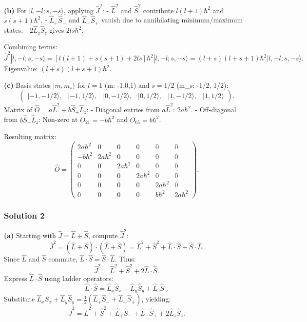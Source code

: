 \documentclass{article}
\begin{document}
\textbf{(b)} For \(|l, -l; s, -s\rangle\), applying \(\hat{J}^2\):
- \(\hat{L}^2\) and \(\hat{S}^2\) contribute \(l(l+1)\hbar^2\) and \(s(s+1)\hbar^2\).
- \(\hat{L}_+ \hat{S}_-\) and \(\hat{L}_- \hat{S}_+\) vanish due to annihilating minimum/maximum states.
- \(2\hat{L}_z \hat{S}_z\) gives \(2ls\hbar^2\).

Combining terms:
\[
\hat{J}^2 |l, -l; s, -s\rangle = \left[ l(l+1) + s(s+1) + 2ls \right]\hbar^2 |l, -l; s, -s\rangle = (l+s)(l+s+1)\hbar^2 |l, -l; s, -s\rangle.
\]
Eigenvalue: \((l+s)(l+s+1)\hbar^2\).

\textbf{(c)} Basis states \(|m, m_s\rangle\) for \(l=1\) (m: -1,0,1) and \(s=1/2\) (m_s: -1/2, 1/2):
\[
\begin{pmatrix}
| -1, -1/2 \rangle, & | -1, 1/2 \rangle, & | 0, -1/2 \rangle, & | 0, 1/2 \rangle, & | 1, -1/2 \rangle, & | 1, 1/2 \rangle
\end{pmatrix}.
\]
Matrix of \(\hat{O} = a\hat{L}^2 + b\hat{S}_+\hat{L}_z\):
- Diagonal entries from \(a\hat{L}^2\): \(2a\hbar^2\).
- Off-diagonal from \(b\hat{S}_+\hat{L}_z\): Non-zero at \(O_{21} = -b\hbar^2\) and \(O_{65} = b\hbar^2\).

Resulting matrix:
\[
\hat{O} = \begin{pmatrix}
2a\hbar^2 & 0 & 0 & 0 & 0 & 0 \\
-b\hbar^2 & 2a\hbar^2 & 0 & 0 & 0 & 0 \\
0 & 0 & 2a\hbar^2 & 0 & 0 & 0 \\
0 & 0 & 0 & 2a\hbar^2 & 0 & 0 \\
0 & 0 & 0 & 0 & 2a\hbar^2 & 0 \\
0 & 0 & 0 & 0 & b\hbar^2 & 2a\hbar^2
\end{pmatrix}.
\]

\subsubsection{Solution 2}

\textbf{(a)} Starting with \(\hat{J} = \hat{L} + \hat{S}\), compute \(\hat{J}^2\):
\[
\hat{J}^2 = (\hat{L} + \hat{S}) \cdot (\hat{L} + \hat{S}) = \hat{L}^2 + \hat{S}^2 + \hat{L} \cdot \hat{S} + \hat{S} \cdot \hat{L}.
\]
Since \(\hat{L}\) and \(\hat{S}\) commute, \(\hat{L} \cdot \hat{S} = \hat{S} \cdot \hat{L}\). Thus:
\[
\hat{J}^2 = \hat{L}^2 + \hat{S}^2 + 2\hat{L} \cdot \hat{S}.
\]
Express \(\hat{L} \cdot \hat{S}\) using ladder operators:
\[
\hat{L} \cdot \hat{S} = \hat{L}_x \hat{S}_x + \hat{L}_y \hat{S}_y + \hat{L}_z \hat{S}_z.
\]
Substitute \(\hat{L}_x \hat{S}_x + \hat{L}_y \hat{S}_y = \frac{1}{2}(\hat{L}_+ \hat{S}_- + \hat{L}_- \hat{S}_+)\), yielding:
\[
\hat{J}^2 = \hat{L}^2 + \hat{S}^2 + \hat{L}_+ \hat{S}_- + \hat{L}_- \hat{S}_+ + 2\hat{L}_z \hat{S}_z.
\]
\end{document}
